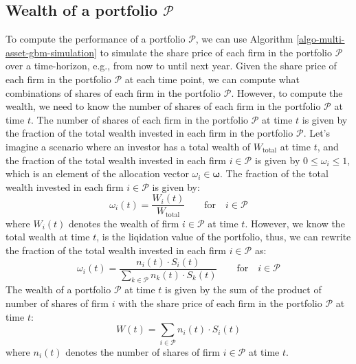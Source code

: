 \documentclass[11pt]{article}
\theoremstyle{definition}
\begin{document}
\subsection*{Wealth of a portfolio $\mathcal{P}$}
To compute the performance of a portfolio $\mathcal{P}$, we can use Algorithm \ref{algo-multi-asset-gbm-simulation} 
to simulate the share price of each firm in the portfolio $\mathcal{P}$ over a time-horizon, e.g., from now to until next year.
Given the share price of each firm in the portfolio $\mathcal{P}$ at each time point, we can compute what combinations of shares of each firm in the portfolio $\mathcal{P}$.	
However, to compute the wealth, we need to know the number of shares of each firm in the portfolio $\mathcal{P}$ at time $t$.
The number of shares of each firm in the portfolio $\mathcal{P}$ at time $t$ is given by the fraction of the total wealth invested in each firm in the portfolio $\mathcal{P}$.
Let's imagine a scenario where an investor has a total wealth of $W_{\text{total}}$ at time $t$, 
and the fraction of the total wealth invested in each firm $i\in\mathcal{P}$
is given by $0\leq{\omega_{i}}\leq{1}$, which is an element of the allocation vector $\omega_{i}\in\mathbf{\omega}$.
The fraction of the total wealth invested in each firm $i\in\mathcal{P}$ is given by:
\begin{equation*}
\omega_{i}(t) = \frac{W_{i}(t)}{W_{\text{total}}}\qquad\text{for}\quad{i\in\mathcal{P}}
\end{equation*}
where $W_{i}(t)$ denotes the wealth of firm $i\in\mathcal{P}$ at time $t$.
However, we know the total wealth at time $t$, is the liqidation value of the portfolio, thus, we can rewrite the fraction of the total wealth invested in each firm $i\in\mathcal{P}$ as:
\begin{equation*}
\omega_{i}(t) = \frac{n_{i}(t)\cdot{S_{i}(t)}}{\displaystyle\sum_{k\in\mathcal{P}}n_{k}(t)\cdot{S}_{k}(t)}\qquad\text{for}\quad{i\in\mathcal{P}}
\end{equation*}
The wealth of a portfolio $\mathcal{P}$ at time $t$ 
is given by the sum of the product of number of shares of firm $i$ with the share price of each firm in the portfolio $\mathcal{P}$ at time $t$:
\begin{equation*}
W(t) = \sum_{i\in\mathcal{P}}n_{i}(t)\cdot{S_{i}(t)}
\end{equation*}
where $n_{i}(t)$ denotes the number of shares of firm $i\in\mathcal{P}$ at time $t$.
\end{document}
